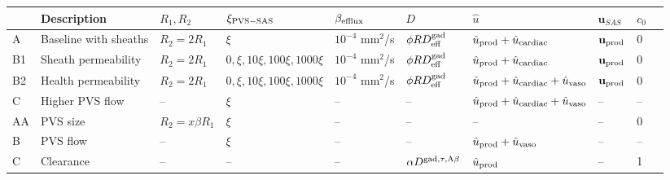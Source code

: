 \documentclass[fleqn,10pt]{wlscirep}
\begin{document}
\begin{table}
  \begin{center}
  \begin{tabular}{ll|llllll|ll}
    \toprule
    & Description & $R_1, R_2$ & $\xi_{\rm PVS-SAS}$ &  $\beta_{\rm efflux}$ & $D$ & $\hat{u}$ & $\mathbf{u}_{SAS}$ & $c_0$ \\
    \midrule
    A & Baseline with sheaths & $R_2 = 2 R_1$ & $\xi$ & $10^{-4}$ mm$^2$/s\cite{hornkjol2022csf} & $\phi R D^{\rm gad}_{\rm eff}$\cite{sykova2008diffusion, valnes2020apparent} & $\hat{u}_{\rm prod} + \hat{u}_{\rm cardiac}$ & $\mathbf{u}_{\rm prod}$ & 0 \\ 
    B1 & Sheath permeability & $R_2 = 2 R_1$ & $0, \xi, 10 \xi, 100 \xi, 1000 \xi$ & $10^{-4}$ mm$^2$/s\cite{hornkjol2022csf} & $\phi R D^{\rm gad}_{\rm eff}$\cite{sykova2008diffusion, valnes2020apparent} & $\hat{u}_{\rm prod} + \hat{u}_{\rm cardiac}$ & $\mathbf{u}_{\rm prod}$ & 0 \\ 
    B2 & Health permeability & $R_2 = 2 R_1$ & $0, \xi, 10 \xi, 100 \xi, 1000 \xi$ & $10^{-4}$ mm$^2$/s\cite{hornkjol2022csf} & $\phi R D^{\rm gad}_{\rm eff}$\cite{sykova2008diffusion, valnes2020apparent} & $\hat{u}_{\rm prod} +  \hat{u}_{\rm cardiac} + \hat{u}_{\rm vaso}$ & $\mathbf{u}_{\rm prod}$ & 0 \\ 
    C & Higher PVS flow & -- & $\xi$ & -- & --  & $\hat{u}_{\rm prod} +  \hat{u}_{\rm cardiac} + \hat{u}_{\rm vaso}$  & -- & --  \\
    AA & PVS size & $R_2 = x \beta R_1$ & $\xi$ & -- & -- & -- &  -- & 0 \\ 
    B & PVS flow & -- & $\xi$ & -- & --  & $\hat{u}_{\rm prod} + \hat{u}_{\rm vaso}$  & -- & --  \\
    C & Clearance & -- & -- & -- & $\alpha D^{\rm gad, \tau, A\beta}$  & $\hat{u}_{\rm prod}$ & -- & 1 \\

\end{tabular}
\end{center}
\end{table}
\end{document}
